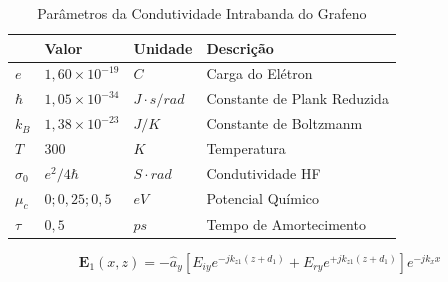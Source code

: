 \begin{table}[htb]
\ABNTEXfontereduzida
\center \caption{Parâmetros da Condutividade Intrabanda do Grafeno \cite{b5}\cite{b13}}
\label{Tab1}
\vline  \begin{tabular}{p{0.6cm}|p{2cm}|p{2cm}|p{6cm}}
  \hline
   \textbf{ } & \textbf{Valor}  & \textbf{Unidade}  & \textbf{Descrição}  \\
   \hline
	\hline
$e$  &  $1,60\times10^{-19}$  &   $C$  &    Carga do Elétron\\
$\hbar$   &   $1,05\times10^{-34}$ & $J\!\cdot\!s/rad $ & Constante de Plank Reduzida\\
$k_B$   &   $1,38\times10^{-23}$ & $J/K $ & Constante de Boltzmanm\\
$T$   &   $300$ & $K$ &  Temperatura\\
$\sigma_0$   &   $e^2/4\hbar$ & $S\!\cdot\!rad$ & Condutividade HF\\
$\mu_c$   &   $0; 0,25; 0,5$ & $eV$ & Potencial Químico\\
$\tau$   &   $0,5$ & $ps$ & Tempo de Amortecimento\\
\hline

\end{tabular}\vline  
\end{table}

\begin{equation}\label{eq3.2}
\textbf{E}_1(x,z) = -\hat{a}_y\left[E_{iy}e^{-jk_{z1}(z+d_1)} + E_{ry}e^{+jk_{z1}(z+d_1)}\right]e^{-jk_x x}  
\end{equation}